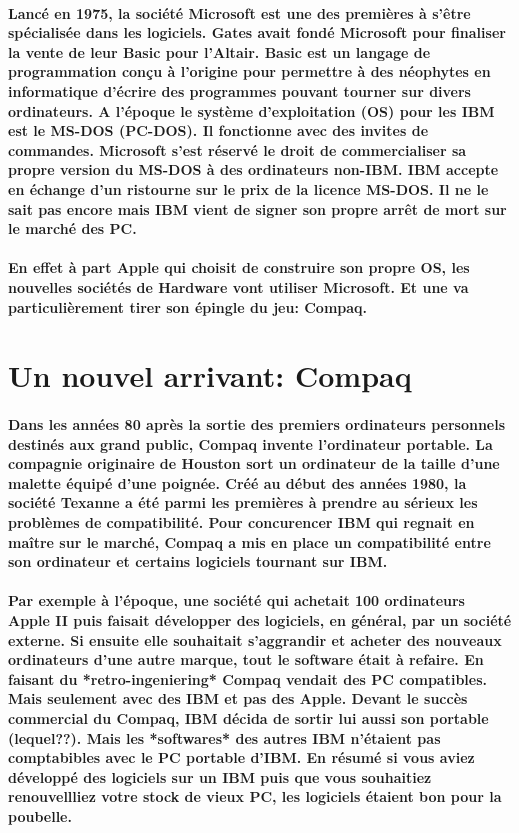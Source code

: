 \paragraph{
  Lancé en 1975, la société Microsoft est une des premières à s'être spécialisée dans les logiciels. Gates avait fondé Microsoft pour finaliser la vente de leur Basic pour l'Altair. Basic est un langage de programmation conçu à l'origine pour permettre à des néophytes en informatique d'écrire des programmes pouvant tourner sur divers ordinateurs. A l'époque le système d'exploitation (OS) pour les IBM est le MS-DOS (PC-DOS). Il fonctionne avec des invites de commandes. Microsoft s'est réservé le droit de commercialiser sa propre version du MS-DOS à des ordinateurs non-IBM. IBM accepte en échange d'un ristourne sur le prix de la licence MS-DOS. Il ne le sait pas encore mais IBM vient de signer son propre arrêt de mort sur le marché des PC.
}

\paragraph{
  En effet à part Apple qui choisit de construire son propre OS, les nouvelles sociétés de Hardware vont utiliser Microsoft. Et une va particulièrement tirer son épingle du jeu: Compaq.
}

\section*{Un nouvel arrivant: Compaq}

\paragraph{
  Dans les années 80 après la sortie des premiers ordinateurs personnels destinés aux grand public, Compaq invente l'ordinateur portable. La compagnie originaire de Houston sort un ordinateur de la taille d'une malette équipé d'une poignée. Créé au début des années 1980, la société Texanne a été parmi les premières à prendre au sérieux les problèmes de compatibilité. Pour concurencer IBM qui regnait en maître sur le marché, Compaq a mis en place un compatibilité entre son ordinateur et certains logiciels tournant sur IBM.
}

\paragraph{
  Par exemple à l'époque, une société qui achetait 100 ordinateurs Apple II puis faisait développer des logiciels, en général, par un société externe. Si ensuite elle souhaitait s'aggrandir et acheter des nouveaux ordinateurs d'une autre marque, tout le software était à refaire. En faisant du *retro-ingeniering* Compaq vendait des PC compatibles. Mais seulement avec des IBM et pas des Apple. Devant le succès commercial du Compaq, IBM décida de sortir lui aussi son portable (lequel??). Mais les *softwares* des autres IBM n'étaient pas comptabibles avec le PC portable d'IBM. En résumé si vous aviez développé des logiciels sur un IBM puis que vous souhaitiez renouvellliez votre stock de vieux PC, les logiciels étaient bon pour la poubelle.
}

